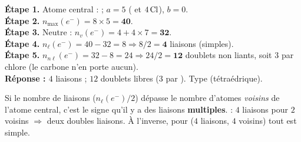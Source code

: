 \documentclass[11pt,a4paper]{article}
\newcommand{\nmax}{n_{\max}(e^-)}
\newcommand{\nv}{n_{v}(e^-)}
\newcommand{\nl}{n_{\ell}(e^-)}
\newcommand{\nnl}{n_{n\ell}(e^-)}
\newcommand{\rep}{\textbf{\textcolor{corcol}{Réponse : }}}
\begin{document}
\begin{cor}
\textbf{Étape 1.} Atome central :  ; $a=5$ ( et $4\,\ce{Cl}$), $b=0$.\\
\textbf{Étape 2.} $\nmax = 8\times 5 = \mathbf{40}$.\\
\textbf{Étape 3.} Neutre : $\nv = 4 + 4\times 7 = \mathbf{32}$.\\
\textbf{Étape 4.} $\nl = 40 - 32 = 8 \Rightarrow 8/2 = \mathbf{4}$ liaisons  (simples).\\
\textbf{Étape 5.} $\nnl = 32 - 8 = 24 \Rightarrow 24/2 = \mathbf{12}$ doublets non liants, soit
$3$ par chlore (le carbone n'en porte aucun).\\
\rep $4$ liaisons  ; $12$ doublets libres ($3$ par ). Type  (tétraédrique).
\end{cor}

\begin{astucebox}
Si le nombre de liaisons ($\nl/2$) dépasse le nombre d'atomes \emph{voisins} de l'atome central,
c'est le signe qu'il y a des liaisons \textbf{multiples}.  : $4$ liaisons pour $2$
voisins $\Rightarrow$ deux doubles liaisons. À l'inverse, pour  ($4$ liaisons, $4$
voisins) tout est simple.
\end{astucebox}
\end{document}
